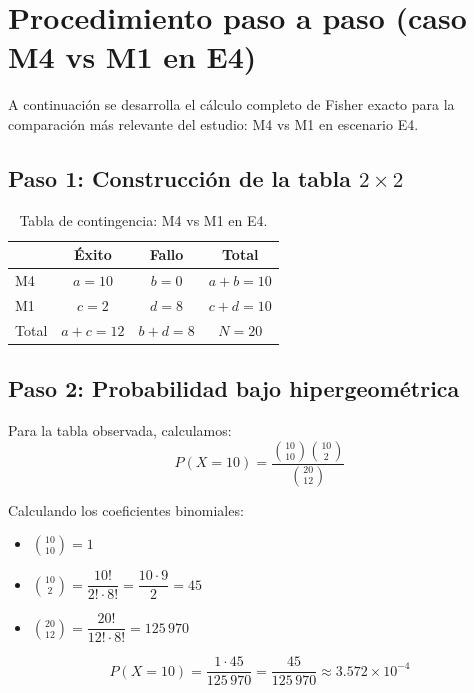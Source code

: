 \documentclass[12pt,a4paper,oneside]{book}
\begin{document}
\newpage
\section{Procedimiento paso a paso (caso M4 vs M1 en E4)}

A continuación se desarrolla el cálculo completo de Fisher exacto para la comparación más relevante del estudio: M4 vs M1 en escenario E4.

\subsection{Paso 1: Construcción de la tabla $2\times 2$}

\begin{table}[H]
\centering
\caption{Tabla de contingencia: M4 vs M1 en E4.}
\renewcommand{\arraystretch}{1.4}
\begin{tabular}{lccc}
\toprule
& \textbf{Éxito} & \textbf{Fallo} & \textbf{Total} \\
\midrule
M4 & $a = 10$ & $b = 0$ & $a+b = 10$ \\
M1 & $c = 2$  & $d = 8$ & $c+d = 10$ \\
\midrule
Total & $a+c = 12$ & $b+d = 8$ & $N = 20$ \\
\bottomrule
\end{tabular}
\end{table}

\subsection{Paso 2: Probabilidad bajo hipergeométrica}

Para la tabla observada, calculamos:
\begin{equation}
P(X = 10) = \frac{\binom{10}{10}\binom{10}{2}}{\binom{20}{12}}
\end{equation}

Calculando los coeficientes binomiales:
\begin{itemize}
    \item $\binom{10}{10} = 1$
    \item $\binom{10}{2} = \dfrac{10!}{2!\cdot 8!} = \dfrac{10\cdot 9}{2} = 45$
    \item $\binom{20}{12} = \dfrac{20!}{12!\cdot 8!} = 125\,970$
\end{itemize}

\begin{equation}
P(X = 10) = \frac{1 \cdot 45}{125\,970} = \frac{45}{125\,970} \approx 3.572 \times 10^{-4}
\end{equation}
\end{document}
